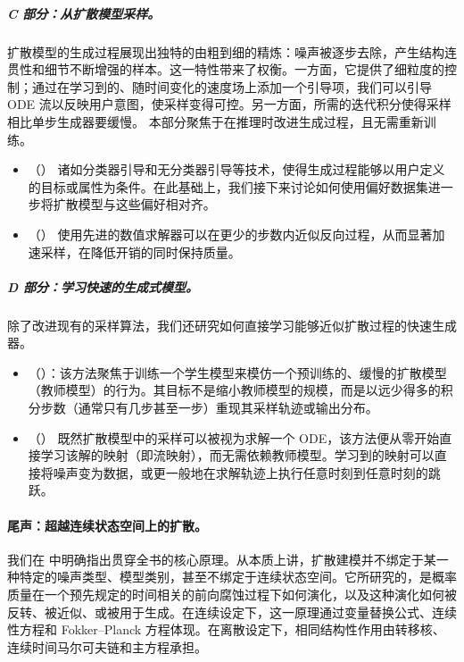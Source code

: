 \subparagraph{C 部分：从扩散模型采样。}扩散模型的生成过程展现出独特的由粗到细的精炼：噪声被逐步去除，产生结构连贯性和细节不断增强的样本。这一特性带来了权衡。一方面，它提供了细粒度的控制；通过在学习到的、随时间变化的速度场上添加一个引导项，我们可以引导 ODE 流以反映用户意图，使采样变得可控。另一方面，所需的迭代积分使得采样相比单步生成器要缓慢。
本部分聚焦于在推理时改进生成过程，且无需重新训练。
\begin{itemize}
    \item {}（）\textbfs{:} 诸如分类器引导和无分类器引导等技术，使得生成过程能够以用户定义的目标或属性为条件。在此基础上，我们接下来讨论如何使用偏好数据集进一步将扩散模型与这些偏好相对齐。
    \item {}（）\textbfs{:} 使用先进的数值求解器可以在更少的步数内近似反向过程，从而显著加速采样，在降低开销的同时保持质量。
\end{itemize}
\subparagraph{D 部分：学习快速的生成式模型。}除了改进现有的采样算法，我们还研究如何直接学习能够近似扩散过程的快速生成器。
\begin{itemize}
    \item {}（）：该方法聚焦于训练一个学生模型来模仿一个预训练的、缓慢的扩散模型（教师模型）的行为。其目标不是缩小教师模型的规模，而是以远少得多的积分步数（通常只有几步甚至一步）重现其采样轨迹或输出分布。
    \item {}（）\textbfs{:} 既然扩散模型中的采样可以被视为求解一个 ODE，该方法便从零开始直接学习该解的映射（即流映射），而无需依赖教师模型。学习到的映射可以直接将噪声变为数据，或更一般地在求解轨迹上执行任意时刻到任意时刻的跳跃。
\end{itemize}



\paragraph{尾声：超越连续状态空间上的扩散。}
我们在 中明确指出贯穿全书的核心原理。从本质上讲，扩散建模并不绑定于某一种特定的噪声类型、模型类别，甚至不绑定于连续状态空间。它所研究的，是概率质量在一个预先规定的时间相关的前向腐蚀过程下如何演化，以及这种演化如何被反转、被近似、或被用于生成。在连续设定下，这一原理通过变量替换公式、连续性方程和 Fokker--Planck 方程体现。在离散设定下，相同结构性作用由转移核、连续时间马尔可夫链和主方程承担。

